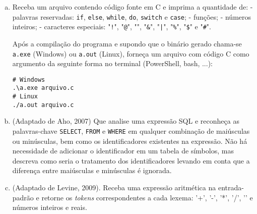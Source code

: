 \begin{enumerate}[a)]
\item Receba um arquivo contendo código fonte em C e imprima a quantidade de:
    - palavras reservadas: {\tt if}, {\tt else}, {\tt while}, {\tt do}, {\tt switch} e {\tt case};
    - funções;
    - números inteiros;
    - caracteres especiais: "{\tt !}", "{\tt @}", "{\tt *}", "{\tt \&}", "{\tt |}", "{\tt \%}", "{\tt \$}" e "{\tt \#}".

Após a compilação do programa e supondo que o binário gerado
chama-se {\tt a.exe} (Windows) ou {\tt a.out} (Linux),
forneça um arquivo com código C como argumento
da seguinte forma no terminal (PowerShell, bash, ...):

\begin{verbatim}
# Windows
.\a.exe arquivo.c
# Linux
./a.out arquivo.c
\end{verbatim}

\item (Adaptado de Aho, 2007) Que analise uma expressão SQL e
  reconheça as palavras-chave {\tt SELECT}, {\tt FROM} e {\tt WHERE}
  em qualquer combinação de maiúsculas ou minúsculas, bem como os
  identificadores existentes na expressão.  Não há necessidade de
  adicionar o identificador em um tabela de símbolos, mas descreva
  como seria o tratamento dos identificadores levando em conta que a
  diferença entre maiúsculas e minúsculas é ignorada.

\item (Adaptado de Levine, 2009). Receba uma expressão aritmética
na entrada-padrão e retorne os {\em tokens} correspondentes a cada
lexema: '+', '-', '*', '/', '\n' e números inteiros e reais.
\end{enumerate}
